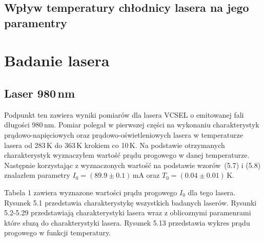 \documentclass[a4paper, portrait,12pt]{report}
\begin{document}
\subsection{Wpływ temperatury chłodnicy lasera na jego paramentry}
\newpage








\section{Badanie lasera}
\subsection{Laser 980\,nm}
Podpunkt ten zawiera wyniki pomiarów dla lasera VCSEL o emitowanej fali długości 980\,nm.
Pomiar polegał w pierwszej części na wykonaniu charakterystyk prądowo-napięciowych
oraz prądowo-oświetleniowych lasera w temperaturze lasera od 283\,K do 363\,K krokiem co 10\,K.
Na podstawie otrzymanych charakterystyk wyznaczyłem wartość prądu progowego w danej temperaturze.
Następnie korzystając z wyznaczonych wartość na podstawie wzorów~(5.7) i (5.8) znalazłem
parametry $I_{0} = (89.9 \pm 0.1)$\,mA oraz $T_0 = (0.04 \pm 0.01)$\,K.

Tabela 1 zawiera wyznazone wartości prądu progowego $I_0$ dla tego lasera. Rysunek 5.1 przedstawia charakterystykę wszystkich badanych laserów. Rysunki 5.2-5.29 przedstawiają charakterystyki lasera wraz z oblicoznymi paramenrami które słuzą do charakterystyki lasera. Rysunek 5.13 przedstawia wykres prądu progowego w funkcji temperatury. \\ 
\end{document}
